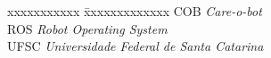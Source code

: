 
\begin{tabbing}
xxxxxxxxxxx \= xxxxxxxxxxxxx \kill
\textsc{COB}            \> \textit{Care-o-bot}\\
\textsc{ROS}            \> \textit{Robot Operating System}\\
\textsc{UFSC} \> \textit{Universidade Federal de Santa Catarina}\\
\end{tabbing}

